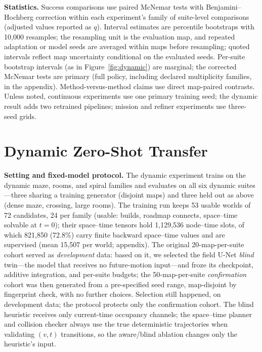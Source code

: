 \documentclass[letterpaper]{article} %
\begin{document}
\textbf{Statistics.} Success comparisons use paired McNemar tests with Benjamini--Hochberg correction within each experiment's family of suite-level comparisons (adjusted values reported as $q$). Interval estimates are percentile bootstraps with 10{,}000 resamples; the resampling unit is the evaluation map, and repeated adaptation or model seeds are averaged within maps before resampling; quoted intervals reflect map uncertainty conditional on the evaluated seeds. Per-suite bootstrap intervals (as in Figure~\ref{fig:dynamic}) are marginal; the corrected McNemar tests are primary (full policy, including declared multiplicity families, in the appendix). Method-versus-method claims use direct map-paired contrasts. Unless noted, continuous experiments use one primary training seed; the dynamic result adds two retrained pipelines; mission and refiner experiments use three-seed grids.

\section{Dynamic Zero-Shot Transfer}

\textbf{Setting and fixed-model protocol.} The dynamic experiment trains on the dynamic maze, rooms, and spiral families and evaluates on all six dynamic suites---three sharing a training generator (disjoint maps) and three held out as above (dense maze, crossing, large rooms). The training run keeps 53 usable worlds of 72 candidates, 24 per family (usable: builds, roadmap connects, space--time solvable at $t{=}0$); their space--time tensors hold 1{,}129{,}536 node--time slots, of which 821{,}850 (72.8\%) carry finite backward space--time values and are supervised (mean 15{,}507 per world; appendix). The original 20-map-per-suite cohort served as \emph{development} data: based on it, we selected the field U-Net \emph{blind} twin---the model that receives no future-motion input---and froze its checkpoint, additive integration, and per-suite budgets; the 50-map-per-suite \emph{confirmation} cohort was then generated from a pre-specified seed range, map-disjoint by fingerprint check, with no further choices. Selection still happened, on development data; the protocol protects only the confirmation cohort. The blind heuristic receives only current-time occupancy channels; the space--time planner and collision checker always use the true deterministic trajectories when validating $(v,t)$ transitions, so the aware/blind ablation changes only the heuristic's input.
\end{document}
